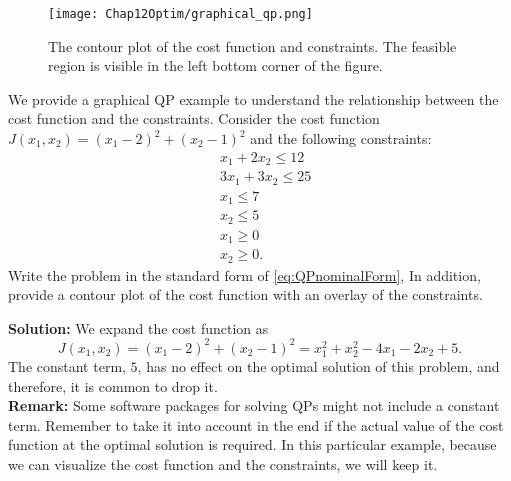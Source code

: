 \vspace*{0.5cm}
\begin{figure}[t]%
\centering
\texttt{[image: Chap12Optim/graphical\_qp.png]}%
\caption[]{The contour plot of the cost function and constraints. The feasible region is visible in the left bottom corner of the figure.
}    
\label{fig:graphicalqp}
\end{figure}

\begin{example}
\label{ex:GraphicalQP}
We provide a graphical QP example to understand the relationship between the cost function and the constraints. Consider the cost function $J(x_1,x_2) = (x_1 - 2)^2 + (x_2 - 1)^2$ and the following constraints:
\begin{align*}
 & x_1 + 2 x_2 \leq 12 \\
 & 3 x_1 + 3 x_2 \leq 25 \\
 & x_1 \leq 7 \\
 & x_2 \leq 5 \\
 & x_1 \geq 0 \\
 & x_2 \geq 0 .
\end{align*}
Write the problem in the standard form of \eqref{eq:QPnominalForm}, In addition, provide a contour plot of the cost function with an overlay of the constraints.
\end{example}

\textbf{Solution:} We expand the cost function as
\begin{equation*}
    J(x_1,x_2) = (x_1 - 2)^2 + (x_2 - 1)^2 = x_1^2 + x_2^2 - 4 x_1 - 2 x_2 + 5 .
\end{equation*}
The constant term, $5$, has no effect on the optimal solution of this problem, and therefore, it is common to drop it. \\

\textbf{Remark:} Some software packages for solving QPs might not include a constant term. Remember to take it into account in the end if the actual value of the cost function at the optimal solution is required. In this particular example, because we can visualize the cost function and the constraints, we will keep it.\\

